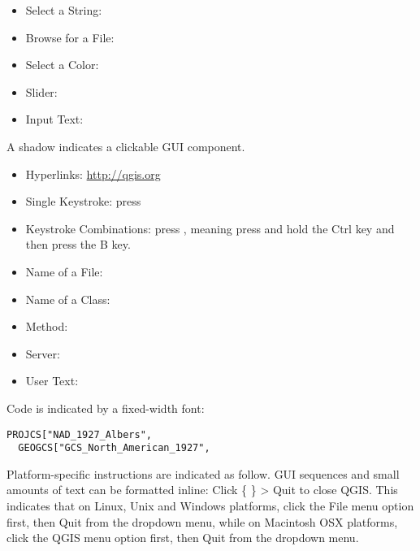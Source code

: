 \begin{itemize}
%
\item Select a String: 
%
%
\item Browse for a File: \browsebutton 
%
\item Select a Color: 
%
\item Slider: 
%
\item Input Text: 
\end{itemize}
A shadow indicates a clickable GUI component.

\begin{itemize}
%
\item Hyperlinks: \url{http://qgis.org}
%
\item Single Keystroke: press 
\item Keystroke Combinations: press , meaning press and
hold the Ctrl key and then press the B key.
\item Name of a File: 
\item Name of a Class: 
\item Method: 
\item Server: 
%
\item User Text: 
\end{itemize}

Code is indicated by a fixed-width font:
\begin{verbatim}
PROJCS["NAD_1927_Albers",
  GEOGCS["GCS_North_American_1927",
\end{verbatim}

Platform-specific instructions are indicated as follow.
GUI sequences and small amounts of text can be formatted inline: %
Click \{\nix{} \} > Quit to %
close QGIS. This indicates that on Linux, Unix and Windows platforms, %
click the File menu option first, then Quit from the dropdown menu, while on %
Macintosh OSX platforms, click the QGIS menu option first, then Quit from the %
dropdown menu.

